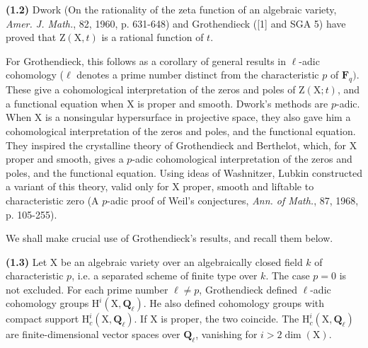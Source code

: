 \documentclass[10pt,leqno]{article}
\begin{document}
\noindent \textbf{(1.2)} Dwork (On the rationality of the zeta function of an algebraic variety, \emph{Amer. J. Math.}, 82, 1960, p. 631-648) and Grothendieck ([1] and SGA 5) have proved that \(\mathrm{Z}(\mathrm{X}, t)\) is a rational function of \(t\).\par

\noindent For Grothendieck, this follows as a corollary of general results in \(\ell \)-adic cohomology (\(\ell \) denotes a prime number distinct from the characteristic \(p\) of \(\mathbf{F}_{q})\). These give a cohomological interpretation of the zeros and poles of \(\mathrm{Z}(\mathrm{X}; t)\), and a functional equation when \(\mathrm{X}\) is proper and smooth. Dwork’s methods are \(p\)-adic. When \(\mathrm{X}\) is a nonsingular hypersurface in projective space, they also gave him a cohomological interpretation of the zeros and poles, and the functional equation. They inspired the crystalline theory of Grothendieck and Berthelot, which, for \(\mathrm{X}\) proper and smooth, gives a \(p\)-adic cohomological interpretation of the zeros and poles, and the functional equation. Using ideas of Washnitzer, Lubkin constructed a variant of this theory, valid only for \(\mathrm{X}\) proper, smooth and liftable to characteristic zero (A \(p\)-adic proof of Weil’s conjectures, \emph{Ann. of Math.}, 87, 1968, p. 105-255).\par

\noindent We shall make crucial use of Grothendieck’s results, and recall them below.\par

\noindent \textbf{(1.3)} Let \(\mathrm{X}\) be an algebraic variety over an algebraically closed field \(k\) of characteristic \(p\), i.e. a separated scheme of finite type over \(k\). The case \(p=0\) is not excluded. For each prime number \(\ell \ne p\), Grothendieck defined \(\ell \)-adic cohomology groups \(\mathrm{H}^{i}(\mathrm{X}, \mathbf{Q}_{\ell })\). He also defined cohomology groups with compact support \(\mathrm{H}_{c}^{i}(\mathrm{X}, \mathbf{Q}_{\ell })\). If \(\mathrm{X}\) is proper, the two coincide. The \(\mathrm{H}_{c}^{i}(\mathrm{X}, \mathbf{Q}_{\ell })\) are finite-dimensional vector spaces over \(\mathbf{Q}_{\ell }\), vanishing for \(i>2 \operatorname{dim}(\mathrm{X})\).\par
\end{document}
